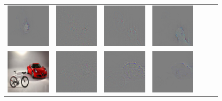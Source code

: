 \begin{figure}
\begin{center}
\begin{tabular}{ccccccc}
\includegraphics[width=0.14\linewidth,height=0.11\linewidth]{figs/examples/googlenet/soft/dog-cat4_diff_243} &
\includegraphics[width=0.14\linewidth,height=0.11\linewidth]{figs/examples/googlenet/oxford/dog-cat4_diff_286} &
\includegraphics[width=0.14\linewidth,height=0.11\linewidth]{figs/examples/googlenet/deconv/dog-cat4_diff_286} &
\includegraphics[width=0.14\linewidth,height=0.11\linewidth]{figs/examples/googlenet/soft/dog-cat4_diff_286} \\
\vspace{-2.5pt}
\includegraphics[width=0.14\linewidth,height=0.11\linewidth]{figs/examples/googlenet/oxford/bic-car1} &
\includegraphics[width=0.14\linewidth,height=0.11\linewidth]{figs/examples/googlenet/oxford/bic-car1_diff_818} &
\includegraphics[width=0.14\linewidth,height=0.11\linewidth]{figs/examples/googlenet/deconv/bic-car1_diff_818} &
\includegraphics[width=0.14\linewidth,height=0.11\linewidth]{figs/examples/googlenet/soft/bic-car1_diff_818} &

\end{tabular}
\end{center}
\end{figure}
